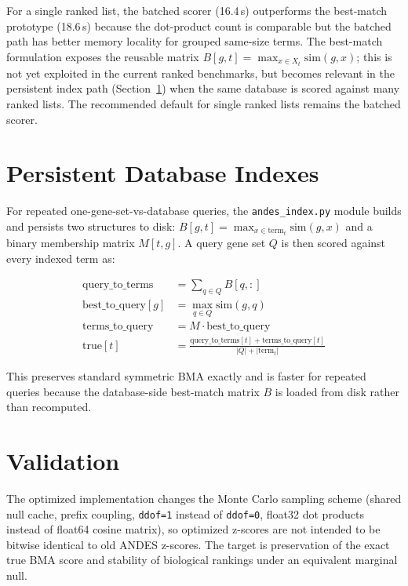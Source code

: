 \documentclass[11pt,a4paper]{article}
\begin{document}
For a single ranked list, the batched scorer (16.4\,s) outperforms the
best-match prototype (18.6\,s) because the dot-product count is comparable
but the batched path has better memory locality for grouped same-size terms.
The best-match formulation exposes the reusable matrix
$B[g,t] = \max_{x \in X_t} \mathrm{sim}(g,x)$; this is not yet exploited
in the current ranked benchmarks, but becomes relevant in the persistent
index path (Section~\ref{sec:index}) when the same database is scored against
many ranked lists. The recommended default for single ranked lists remains the
batched scorer.

\section{Persistent Database Indexes}
\label{sec:index}

For repeated one-gene-set-vs-database queries, the \texttt{andes\_index.py}
module builds and persists two structures to disk:
$B[g, t] = \max_{x \in \text{term}_t} \mathrm{sim}(g, x)$ and a binary
membership matrix $M[t, g]$. A query gene set $Q$ is then scored against
every indexed term as:

\begin{align*}
	\text{query\_to\_terms}   & = \textstyle\sum_{q \in Q} B[q, :]                      \\
	\text{best\_to\_query}[g] & = \max_{q \in Q} \mathrm{sim}(g, q)                     \\
	\text{terms\_to\_query}   & = M \cdot \text{best\_to\_query}                        \\
	\text{true}[t]            & = \frac{\text{query\_to\_terms}[t]
		                              + \text{terms\_to\_query}[t]}{|Q| + |\text{term}_t|}
\end{align*}

This preserves standard symmetric BMA exactly and is faster for repeated
queries because the database-side best-match matrix $B$ is loaded from disk
rather than recomputed.

\section{Validation}
\label{sec:validation}

The optimized implementation changes the Monte Carlo sampling scheme (shared
null cache, prefix coupling, \texttt{ddof=1} instead of \texttt{ddof=0},
float32 dot products instead of float64 cosine matrix), so optimized z-scores
are not intended to be bitwise identical to old ANDES z-scores. The target is
preservation of the exact true BMA score and stability of biological rankings
under an equivalent marginal null.
\end{document}
